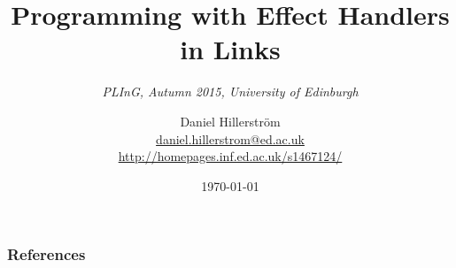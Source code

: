 \documentclass[10pt,compress]{beamer}
\author{Daniel Hillerström\\\footnotesize{\href{mailto:daniel.hillerstrom@ed.ac.uk}{daniel.hillerstrom@ed.ac.uk}\\\href{http://homepages.inf.ed.ac.uk/s1467124/}{http://homepages.inf.ed.ac.uk/s1467124/}}}
\title{Programming with Effect Handlers in Links}
\subtitle{\textit{PLInG, Autumn 2015, University of Edinburgh}}
\institute[University of Edinburgh]{School of Informatics\\The University of Edinburgh}
\date{\today}
\begin{document}
\begin{frame}
  \titlepage
\end{frame}



\nocite{*}

\begin{frame}[allowframebreaks]
  \frametitle{References}
  
\end{frame}
\end{document}
